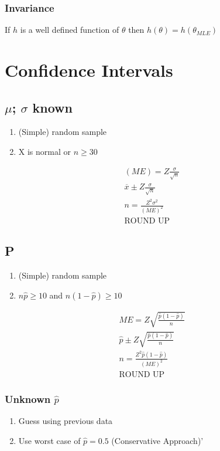 \subsubsection{Invariance}
If $h$ is a well defined function of $\theta$ then $h(\theta) = h(\theta_{MLE})$

\section{Confidence Intervals}
\subsection{$\mu$; $\sigma$ known}
\begin{enumerate}
\item (Simple) random sample
\item X is normal or $n \geq 30$
\end{enumerate}

\begin{align}
  (ME) = Z\frac{\sigma}{\sqrt{n}} \\
  \overbar{x} \pm Z\frac{\sigma}{\sqrt{n}} \\
  n = \frac{Z^2\sigma^2}{(ME)^2} \\
  \text{ROUND UP}
\end{align}

\subsection{P}
\begin{enumerate}
\item (Simple) random sample
\item $n\hat{p} \geq 10$ and $ n(1 - \hat{p}) \geq 10$
\end{enumerate}

\begin{align}
  ME = Z\sqrt{\frac{\hat{p}(1-\hat{p})}{n}} \\
  \hat{p} \pm Z\sqrt{\frac{\hat{p}(1-\hat{p})}{n}} \\
  n = \frac{Z^2\hat{p}(1 - \hat{p})}{(ME)^2} \\
  \text{ROUND UP}
\end{align}

\subsubsection{Unknown $\hat{p}$}
\begin{enumerate}
\item Guess using previous data
\item Use worst case of $\hat{p} = 0.5$ (Conservative Approach)'
\end{enumerate}

